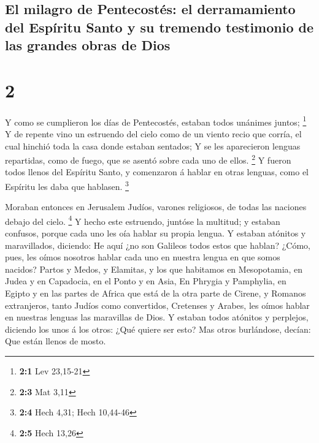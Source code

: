\hypertarget{el-milagro-de-pentecostuxe9s-el-derramamiento-del-espuxedritu-santo-y-su-tremendo-testimonio-de-las-grandes-obras-de-dios}{%
\subsection{El milagro de Pentecostés: el derramamiento del Espíritu
Santo y su tremendo testimonio de las grandes obras de
Dios}\label{el-milagro-de-pentecostuxe9s-el-derramamiento-del-espuxedritu-santo-y-su-tremendo-testimonio-de-las-grandes-obras-de-dios}}

\hypertarget{section-1}{%
\section{2}\label{section-1}}

 Y como se cumplieron los días de Pentecostés, estaban
todos unánimes juntos; \footnote{\textbf{2:1} Lev 23,15-21}
 Y de repente vino un estruendo del cielo como de un
viento recio que corría, el cual hinchió toda la casa donde estaban
sentados;  Y se les aparecieron lenguas repartidas, como
de fuego, que se asentó sobre cada uno de ellos. \footnote{\textbf{2:3}
  Mat 3,11}  Y fueron todos llenos del Espíritu Santo, y
comenzaron á hablar en otras lenguas, como el Espíritu les daba que
hablasen. \footnote{\textbf{2:4} Hech 4,31; Hech 10,44-46}

 Moraban entonces en Jerusalem Judíos, varones religiosos,
de todas las naciones debajo del cielo. \footnote{\textbf{2:5} Hech
  13,26}  Y hecho este estruendo, juntóse la multitud; y
estaban confusos, porque cada uno les oía hablar su propia lengua.
 Y estaban atónitos y maravillados, diciendo: He aquí ¿no
son Galileos todos estos que hablan?  ¿Cómo, pues, les
oímos nosotros hablar cada uno en nuestra lengua en que somos nacidos?
 Partos y Medos, y Elamitas, y los que habitamos en
Mesopotamia, en Judea y en Capadocia, en el Ponto y en Asia,
 En Phrygia y Pamphylia, en Egipto y en las partes de
Africa que está de la otra parte de Cirene, y Romanos extranjeros, tanto
Judíos como convertidos,  Cretenses y Arabes, les oímos
hablar en nuestras lenguas las maravillas de Dios.  Y
estaban todos atónitos y perplejos, diciendo los unos á los otros: ¿Qué
quiere ser esto?  Mas otros burlándose, decían: Que están
llenos de mosto.

